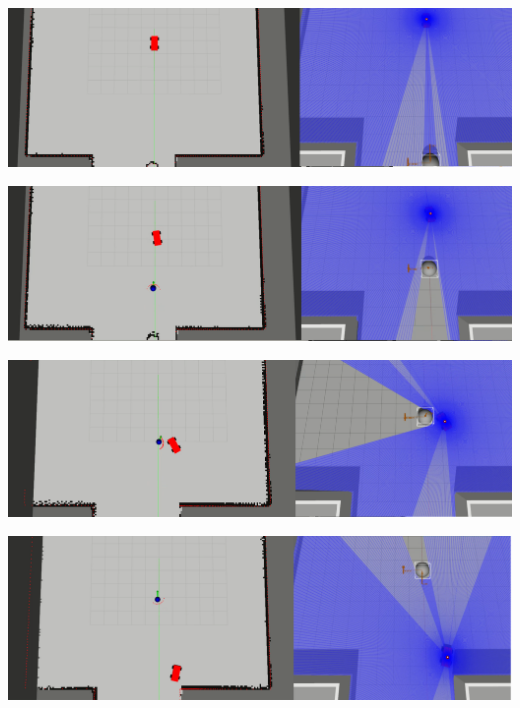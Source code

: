 \begin{minipage}{\textwidth}
	\includegraphics[width=\textwidth]{figures/raw/local_planner_test_straight_traj_dyn_obj_1.png}

	\vspace{0.5cm}
	\includegraphics[width=\textwidth]{figures/raw/local_planner_test_straight_traj_dyn_obj_2.png}

	\vspace{0.5cm}
	\includegraphics[width=\textwidth]{figures/raw/local_planner_test_straight_traj_dyn_obj_3.png}

	\vspace{0.5cm}
	\includegraphics[width=\textwidth]{figures/raw/local_planner_test_straight_traj_dyn_obj_4.png}

	\label{local_planner_test_straight_traj_dyn_obj}
\end{minipage}

